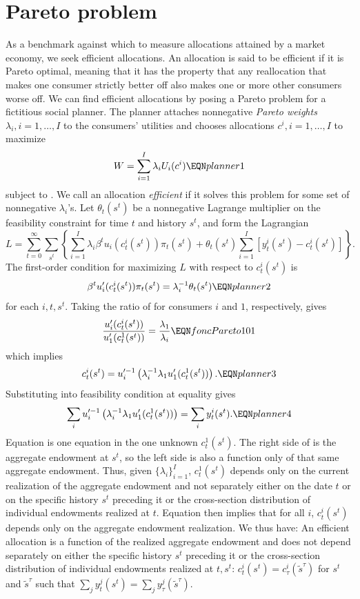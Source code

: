 \section{Pareto problem}
As a benchmark against which to measure allocations attained by a
market  economy, we seek efficient allocations. An allocation is
said to be efficient if it is Pareto optimal, meaning that  it has the property
that any reallocation  that makes one consumer strictly better
off also makes one or more other consumers worse off. We can find
efficient allocations by posing a Pareto problem for a fictitious
social planner. The  planner attaches nonnegative {\it Pareto
weights\/} $\lambda_i, i=1, \ldots, I$ to the consumers' utilities and
chooses allocations $c^i, i=1, \ldots, I$ to maximize
$$ W = \sum_{i=1}^I \lambda_i U_i(c^i)  \EQN planner1  $$
subject to .
We call an allocation {\it efficient\/}
if it solves this problem for some set of
nonnegative $\lambda_i$'s.
Let $\theta_t(s^t)$ be a nonnegative Lagrange multiplier on the
feasibility constraint 
for time  $t$ and  history  $s^t$,  and form
the Lagrangian
$$ L =
 \sum_{t=0}^\infty \sum_{s^t}
   \left\{  \sum_{i=1}^I \lambda_i \beta^t u_i(c_t^i(s^t)) \pi_t(s^t)
     + \theta_t(s^t) \sum_{i=1}^I [ y_t^i(s^t) - c_t^i(s^t) ]  \right\} . $$
The first-order condition for maximizing $L$
with respect to $c_t^i(s^t)$ is
$$ \beta^t u'_i(c_t^i(s^t))\pi_t(s^t) = \lambda_i^{-1}  \theta_t(s^t)
\EQN planner2 $$
for each $i, t, s^t$.  Taking the ratio of  for  consumers
$i$ and $1$, respectively,
gives
$$ {u'_i(c^i_t(s^t)) \over u'_1(c^1_t(s^t))} = {\lambda_1  \over \lambda_i}  \EQN foncPareto101 $$
which implies
$$ c_t^i(s^t) = u^{\prime -1}_i
    \left(\lambda_i^{-1} \lambda_1 u'_1(c_t^1(s^t)) \right). \EQN planner3
$$
Substituting  into feasibility condition  at
equality gives
$$ \sum_i u^{\prime -1}_i
    \left(\lambda_i^{-1} \lambda_1 u'_1(c_t^1(s^t)) \right)
  = \sum_i y_t^i(s^t)  . \EQN planner4 $$
Equation  is one equation in the one unknown  $c_t^1(s^t)$. The right
side of  is the  aggregate endowment at $s^t$, so the
left side is  also a function only of that same aggregate endowment. Thus, given $\{\lambda_i\}_{i=1}^I$,
$c_t^1(s^t)$ depends only on the current realization of the
aggregate endowment and not separately  either on  the date $t$ or on the specific history $s^t$
preceding it  or  the cross-section distribution of individual
endowments realized at $t$. Equation  then implies that for all $i$,
$c_t^i(s^t)$ depends only on the aggregate endowment realization.
We thus have:
\medskip
{} An efficient allocation is a function of
the realized aggregate endowment and  does not depend separately  on either the specific history $s^t$
preceding it or  the cross-section distribution of individual
endowments realized at $t, s^t$: $c_t^i(s^t)=c_\tau^i(\tilde
s^{\tau})$ for $s^t$ and $\tilde s^{\tau}$ such that $\sum_j
y_t^j(s^t) = \sum_j y_\tau^j(\tilde s^{\tau})$.
\medskip

